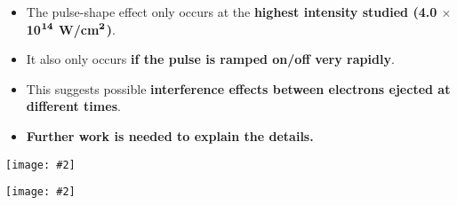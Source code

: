 \documentclass[landscape,a0b,final]{a0poster}
\newenvironment{poster}{
  \begin{center}
  \begin{minipage}[c]{0.98\textwidth}
}{
  \end{minipage} 
  \end{center}
}
\newcommand{\pbox}[4]{
\psshadowbox[#3]{
\begin{minipage}[t][#2][t]{#1}
#4
\end{minipage}
}}
\newcommand{\myfig}[3][0]{
\begin{center}
  \vspace{1.5cm}
  \texttt{[image: \#2]}
  \nobreak\medskip
\end{center}}
\newcommand{\mycaption}[1]{
  \vspace{0.5cm}
  \begin{quote}
    {{\sc Fig.} \arabic{figure}: #1}
  \end{quote}
  \vspace{1cm}
  \stepcounter{figure}
}
\begin{document}
\begin{poster}
\begin{multicols}{3}
\begin{itemize}
\item The pulse-shape effect only occurs at the {\bf\color{red} highest intensity studied (4.0 $\bm{\times}$ 10$^{\bf 14}$ W/cm$^{\bf 2}$)}.
\item It also only occurs {\bf\color{red} if the pulse is ramped on/off very rapidly}.
\item This suggests possible {\bf\color{blue} interference effects between electrons ejected at different times}.
\item {\bf\color{newgreen} Further work is needed to explain the details.}
\end{itemize}


  \vfill
  \columnbreak




  \vspace{1cm}\begin{center}\pbox{0.8\columnwidth}{}{linewidth=2mm,framearc=0.1,linecolor=lightblue,fillstyle=gradient,
             gradangle=0,gradbegin=whiteblue,gradend=whiteblue,gradmidpoint=1.0,framesep=1em}{\begin{center}{\Large\bf Results}\end{center}}\end{center}\vspace{1.25cm}


  \vspace{-2.0cm}
  \setlength{\columnsep}{0pt}
  \setlength{\columnseprule}{0pt}
  \hspace{-2cm}
  \begin{multicols}{2}
  


  \end{multicols}

  \vspace{-3.0cm}
  \setlength{\columnsep}{0pt}
  \setlength{\columnseprule}{0pt}
  \hspace{-2cm}
  \begin{multicols}{2}
  \begin{center}
  \myfig{c_overlap_350_4.ps}{1.0}
  \end{center}
  \begin{center}
  \myfig{c_approx_ionization.ps}{1.0}
  \end{center}
  \end{multicols}


\end{multicols}
\end{poster}
\end{document}
